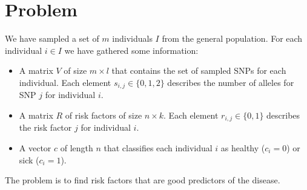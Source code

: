 \documentclass[a4paper]{article}
\begin{document}
\section{Problem}
We have sampled a set of $m$ individuals $I$ from the general population. For each individual $i \in I$ we have gathered some information:
\begin{itemize}
  \item A matrix $V$ of size $m \times l$ that contains the set of sampled SNPs for each individual. Each element $s_{i,j} \in \{0,1,2\}$ describes the number of alleles for SNP $j$ for individual $i$.
  \item A matrix $R$ of risk factors of size $n \times k$. Each element $r_{i,j} \in \{0,1\}$ describes the risk factor $j$ for individual $i$.
  \item A vector $c$ of length $n$ that classifies each individual $i$ as healthy ($c_i = 0$) or sick ($c_i = 1$).
\end{itemize}
The problem is to find risk factors that are good predictors of the disease.
\end{document}
